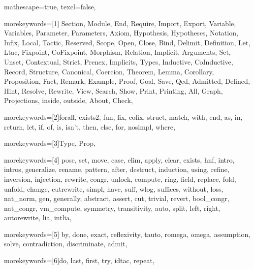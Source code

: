 
 {

mathescape=true,
texcl=false,


morekeywords=[1]{
Section, Module, End, Require, Import, Export,
Variable, Variables, Parameter, Parameters, Axiom, Hypothesis, Hypotheses,
Notation, Infix, Local, Tactic, Reserved, Scope, Open, Close, Bind, Delimit,
Definition, Let, Ltac, Fixpoint, CoFixpoint, Morphism, Relation,
Implicit, Arguments, Set, Unset, Contextual, Strict, Prenex,
Implicits, Types,
Inductive, CoInductive, Record, Structure, Canonical, Coercion,
Theorem, Lemma, Corollary, Proposition, Fact, Remark, Example,
Proof, Goal, Save, Qed, Admitted, Defined, Hint, Resolve, Rewrite, View,
Search, Show, Print, Printing, All, Graph, Projections,
inside, outside,
About, Check},


morekeywords=[2]{forall, exists2, fun, fix, cofix, struct,
      match, with, end, as, in, return, let, if, of, is, isn't, then, else,
      for, nosimpl, where},

morekeywords=[3]{Type, Prop},

morekeywords=[4]{
         pose, set, move, case, elim, apply, clear, exists,
            hnf, intro, intros, generalize, rename, pattern, after,
            destruct, induction, using, refine, inversion, injection,
         rewrite, congr, unlock, compute, ring, field,
            replace, fold, unfold, change, cutrewrite, simpl,
         have, suff, wlog, suffices, without, loss, nat_norm,
         gen, generally, abstract,
            assert, cut, trivial, revert, bool_congr, nat_congr, vm_compute,
         symmetry, transitivity, auto, split, left, right,
         autorewrite, lia, intlia},

morekeywords=[5]{
         by, done, exact, reflexivity, tauto, romega, omega,
         assumption, solve, contradiction, discriminate, admit},


morekeywords=[6]{do, last, first, try, idtac, repeat},

}
